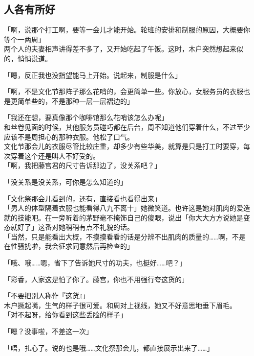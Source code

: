 \subsection{人各有所好}

「啊，说那个打工啊，要等一会儿才能开始。轮班的安排和制服的原因，大概要你等个一两周」\\

两个人的夫妻相声讲得差不多了，又开始吃起了午饭。这时，木户突然想起来似的，悄悄说道。

「嗯，反正我也没指望能马上开始。说起来，制服是什么」

「啊，不是文化节那阵子那么花哨的，会更简单一些。你放心，女服务员的衣服也是更简单些的，不是那种一层一层褶边的」

「我还在想，要真像那个咖啡馆那么花哨该怎么办呢」\\

和丝卷见面的时候，其他服务员碰巧都在后台，周不知道他们穿着什么，不过至少应该不是周担心的那种衣服。他松了口气。\\

文化节那会儿的衣服尽管比较庄重，却多少有些华美，就算是只是打工时要穿，每次穿着这个还是叫人不好受的。\\

「啊，我把藤宫君的尺寸告诉那边了，没关系吧？」

「没关系是没关系，可你是怎么知道的」

「文化祭那会儿看到的，还有，直接看也看得出来」\\

「男人的体型隔着衣服也能看得八九不离十」她微笑道。也许这是她对肌肉的爱造就的技能吧。在一旁听着的茅野毫不掩饰自己的傻眼，说出「你大大方方说她是变态就好了」这番对她稍稍有点不礼貌的话。\\

「当然，只是能看出大概，不摸摸看看的话是分辨不出肌肉的质量的……啊，不是在性骚扰啦，我会征求同意然后再检查的」

「哦、哦……嗯，省下了告诉她尺寸的功夫，也挺好……吧？」

「彩香，人家这是怕了你了。藤宫，你也不用强行夸这货的」

「不要把别人称作『这货』」\\

木户撅起嘴，生气的样子很可爱。和周对上视线，她又不好意思地垂下眉毛。\\

「对不起呀，给你看到这些丢脸的样子」

「嗯？没事啦，不差这一次」

「唔，扎心了。说的也是哦……文化祭那会儿，都直接展示出来了……」

